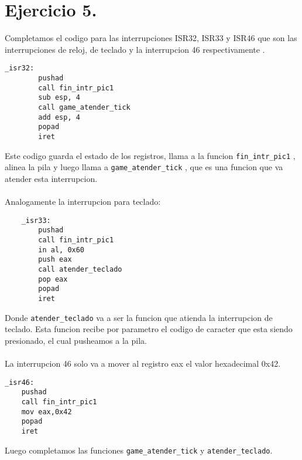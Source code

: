 \section*{Ejercicio 5.}

\noindent Completamos el codigo para las interrupciones ISR32, ISR33 y ISR46 que son las interrupciones de reloj, de teclado y la interrupcion 46 respectivamente .


\begin{codesnippet}
\begin{verbatim}
_isr32:
        pushad
        call fin_intr_pic1
        sub esp, 4
        call game_atender_tick
        add esp, 4
        popad  
        iret
		\end{verbatim}
\end{codesnippet}

\noindent Este codigo  guarda el estado de los registros, llama a la funcion \texttt{fin\_intr\_pic1} , alinea la pila y luego llama a \texttt{game\_atender\_tick} , que es una funcion que va atender esta interrupcion.\\
\\
Analogamente la interrupcion para teclado:

\begin{codesnippet}
\begin{verbatim}
    _isr33:
        pushad
        call fin_intr_pic1
        in al, 0x60
        push eax
        call atender_teclado
        pop eax
        popad  
        iret    
    \end{verbatim}
\end{codesnippet}

\noindent Donde \texttt{atender\_teclado} va a ser la funcion que atienda la interrupcion de teclado. Esta funcion recibe por parametro el codigo de caracter que esta siendo presionado, el cual pusheamos a la pila.
\\
\\
La interrupcion 46 solo va a mover al registro eax el valor hexadecimal 0x42.

\begin{codesnippet}
\begin{verbatim}
_isr46:
    pushad
    call fin_intr_pic1
    mov eax,0x42
    popad
    iret    
    \end{verbatim}
\end{codesnippet}

\newpage

\noindent Luego completamos las funciones \texttt{game\_atender\_tick} y \texttt{atender\_teclado}.

